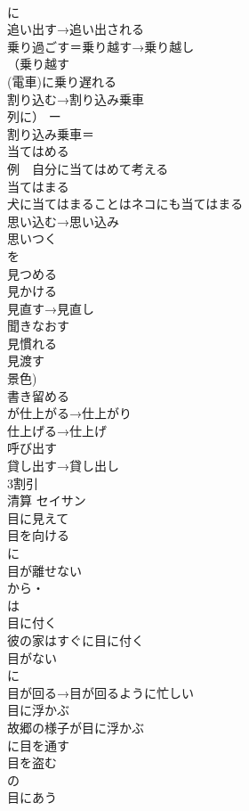 \documentclass[8pt]{extreport}
\begin{document}
\begin{CJK}{UTF8}{min}
\\	に
\\	追い出す→追い出される	
\\	乗り過ごす＝乗り越す→乗り越し	
\\	（乗り越す
\\	(電車)に乗り遅れる	
\\	割り込む→割り込み乗車	
\\	列に） ー
\\	割り込み乗車＝ 
\\	当てはめる	
\\	例　自分に当てはめて考える 
\\	当てはまる	
\\	犬に当てはまることはネコにも当てはまる 
\\	思い込む→思い込み	
\\	思いつく	
\\	を
\\	見つめる	
\\	見かける	
\\	見直す→見直し	
\\	聞きなおす	
\\	見慣れる	
\\	見渡す	
\\	景色)
\\	書き留める	
\\	が仕上がる→仕上がり	
\\	仕上げる→仕上げ	
\\	呼び出す	
\\	貸し出す→貸し出し	
\\	3割引	
\\	清算	セイサン 
\\	目に見えて	
\\	目を向ける	
\\	に
\\	目が離せない	
\\	から・
\\	は
\\	目に付く	
\\	彼の家はすぐに目に付く
\\	目がない	
\\	に
\\	目が回る→目が回るように忙しい	
\\	目に浮かぶ	
\\	故郷の様子が目に浮かぶ 
\\	に目を通す	
\\	目を盗む	
\\	の
\\	目にあう	

\end{CJK}
\end{document}

